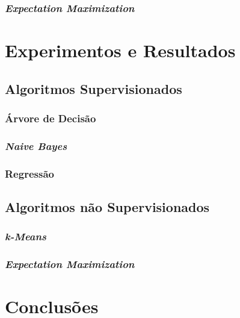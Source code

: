 \documentclass{article}
\begin{document}
\subsubsection{{\b \it Expectation Maximization}}

\section{Experimentos e Resultados}

\subsection{Algoritmos Supervisionados}

\subsubsection{Árvore de Decisão}

\subsubsection{{\b \it Naive Bayes}}

\subsubsection{Regressão}

\subsection{Algoritmos não Supervisionados}

\subsubsection{{\b \it k-Means}}

\subsubsection{{\b \it Expectation Maximization}}

\section{Conclusões}


\end{document}
